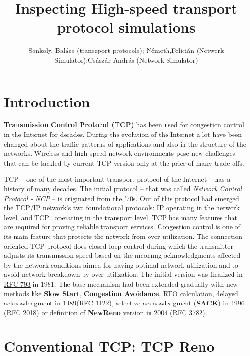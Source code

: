 \documentclass[a4paper]{article}
\title{Inspecting High-speed transport protocol simulations}
\author{Sonkoly, Balázs (transzport protocols); Németh,Felicián (Network Simulator);Császár András (Network Simulator) }
\date{}
\begin{document}
\maketitle

\tableofcontents

\section{Introduction}

\textbf{Transmission Control Protocol (TCP)} has been used for congestion control in the Internet for decades. During the evolution of the Internet a lot have been changed about the traffic patterns of applications and also in the structure of the networks. Wireless and high-speed network environments pose new challenges that can be tackled by current TCP version only at the price of many trade-offs.

TCP -- one of the most important transport protocol of the Internet -- has a history of many decades. The initial protocol -- that was called \emph{Network Control Protocol - NCP} -- is originated from the '70s. Out of this protocol had emerged the TCP/IP network's two foundational protocols: IP operating in the network level, and TCP~\cite{CongestionAvoidance} operating in the transport level. TCP has many features that are required for proving reliable transport services. Congestion control is one of its main feature that protects the network from over-utilization. The connection-oriented TCP protocol does closed-loop control during which the transmitter adjusts its transmission speed based on the incoming acknowledgments affected by the network conditions aimed for having optimal network utilization and to avoid network breakdown by over-utilization. The initial version was finalized in \href{http://www.faqs.org/rfcs/rfc793.html}{RFC 793} in 1981. The base mechanism had been extended gradually with new methods like \textbf{Slow Start}, \textbf{Congestion Avoidance}, RTO calculation, delayed acknowledgment in 1989(\href{http://www.faqs.org/rfcs/rfc1122.html}{RFC 1122}), selective acknowledgment (\textbf{SACK}) in 1996 (\href{http://www.faqs.org/rfcs/rfc2018.html}{RFC 2018}) or definition of \textbf{NewReno} version in 2004 (\href{http://www.faqs.org/rfcs/rfc3782.html}{RFC 3782}).

\section{Conventional TCP: TCP Reno}
\end{document}
